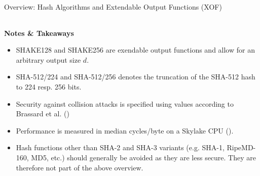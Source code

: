 \begin{algorithmbox}{Overview: Hash Algorithms and Extendable Output Functions (XOF)}
\begin{center}
\begin{tabular}{ccccc|ccc|ccc|cc|c}
            \hline
        \end{tabular}
    \end{center}
    {\bfseries Notes \& Takeaways}
    \normalfont
    \begin{itemize}
        \item SHAKE128 and SHAKE256 are exendable output functions and allow for an arbitrary output size $d$.
        \item SHA-512/224 and SHA-512/256 denotes the truncation of the SHA-512 hash to 224 resp. 256 bits.
        \item Security against collision attacks is specified using values according to Brassard et al. ()
        \item Performance is measured in median cycles/byte on a Skylake CPU ().
        \item Hash functions other than SHA-2 and SHA-3 variants (e.g. SHA-1, RipeMD-160, MD5, etc.) should generally be avoided as they are less secure. They are therefore not part of the above overview.
    \end{itemize}
\end{algorithmbox}
